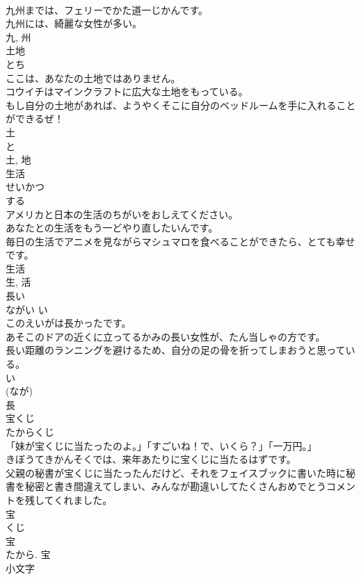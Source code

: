 \documentclass[8pt]{extreport}
\begin{document}
\begin{CJK}{UTF8}{min}
\\	九州までは、フェリーでかた道一じかんです。	
\\	九州には、綺麗な女性が多い。	
\\	九, 州	
\\	土地	
\\	とち	
\\	ここは、あなたの土地ではありません。	
\\	コウイチはマインクラフトに広大な土地をもっている。	
\\	もし自分の土地があれば、ようやくそこに自分のベッドルームを手に入れることができるぜ！	
\\	土 
\\	と 
\\	土, 地	
\\	生活	
\\	せいかつ	
\\	する 
\\	アメリカと日本の生活のちがいをおしえてください。	
\\	あなたとの生活をもう一どやり直したいんです。	
\\	毎日の生活でアニメを見ながらマシュマロを食べることができたら、とても幸せです。	
\\	生活 
\\	生, 活	
\\	長い	
\\	ながい	い 
\\	このえいがは長かったです。	
\\	あそこのドアの近くに立ってるかみの長い女性が、たん当しゃの方です。	
\\	長い距離のランニングを避けるため、自分の足の骨を折ってしまおうと思っている。	
\\	い 
\\	(なが) 
\\	長	
\\	宝くじ	
\\	たからくじ	
\\	「妹が宝くじに当たったのよ。」「すごいね！で、いくら？」「一万円。」	
\\	きぼうてきかんそくでは、来年あたりに宝くじに当たるはずです。	
\\	父親の秘書が宝くじに当たったんだけど、それをフェイスブックに書いた時に秘書を秘密と書き間違えてしまい、みんなが勘違いしてたくさんおめでとうコメントを残してくれました。	
\\	宝 
\\	くじ 
\\	宝 
\\	たから.	宝	
\\	小文字	

\end{CJK}
\end{document}
